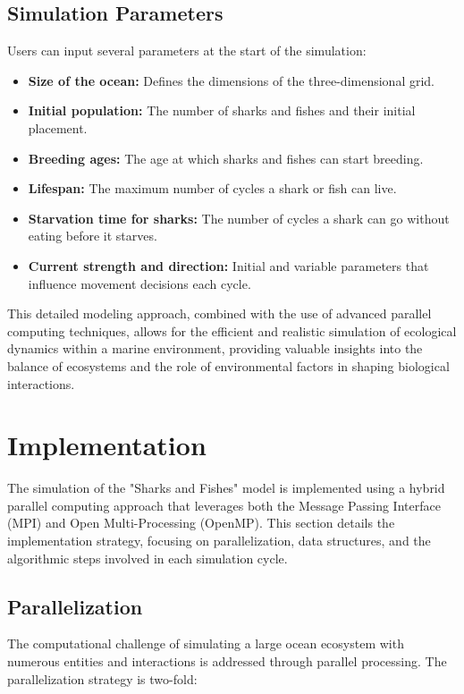 \documentclass[conference,compsoc]{IEEEtran}
\begin{document}
\subsection{Simulation Parameters}
Users can input several parameters at the start of the simulation:
\begin{itemize}
\item \textbf{Size of the ocean:} Defines the dimensions of the three-dimensional grid.
\item \textbf{Initial population:} The number of sharks and fishes and their initial placement.
\item \textbf{Breeding ages:} The age at which sharks and fishes can start breeding.
\item \textbf{Lifespan:} The maximum number of cycles a shark or fish can live.
\item \textbf{Starvation time for sharks:} The number of cycles a shark can go without eating before it starves.
\item \textbf{Current strength and direction:} Initial and variable parameters that influence movement decisions each cycle.
\end{itemize}

This detailed modeling approach, combined with the use of advanced parallel computing techniques, allows for the efficient and realistic simulation of ecological dynamics within a marine environment, providing valuable insights into the balance of ecosystems and the role of environmental factors in shaping biological interactions.



\section{Implementation}

The simulation of the "Sharks and Fishes" model is implemented using a hybrid parallel computing approach that leverages both the Message Passing Interface (MPI) and Open Multi-Processing (OpenMP). This section details the implementation strategy, focusing on parallelization, data structures, and the algorithmic steps involved in each simulation cycle.


\subsection{Parallelization}

The computational challenge of simulating a large ocean ecosystem with numerous entities and interactions is addressed through parallel processing. The parallelization strategy is two-fold:
\end{document}
